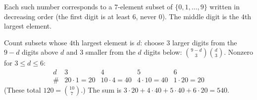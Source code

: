 Each such number corresponds to a $7$-element subset of $\{0,1,\dots,9\}$ written in decreasing order (the first digit is at least $6$, never $0$). The middle digit is the $4$th largest element.

Count subsets whose $4$th largest element is $d$: choose $3$ larger digits from the $9-d$ digits above $d$ and $3$ smaller from the $d$ digits below: $\binom{9-d}3\binom d3$. Nonzero for $3\le d\le6$:
\[\begin{array}{c|cccc}d&3&4&5&6\\\hline\#&20\cdot1=20&10\cdot4=40&4\cdot10=40&1\cdot20=20\end{array}\]
(These total $120=\binom{10}7$.) The sum is $3\cdot20+4\cdot40+5\cdot40+6\cdot20=\boxed{540}$.
